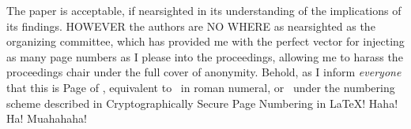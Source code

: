 \documentclass[12pt]{sigbovik-review}
\author{Anonymous}
\begin{document}
\maketitle

The paper is acceptable, if nearsighted in its understanding of the implications of its findings. HOWEVER the authors are NO WHERE as nearsighted as the organizing committee, which has provided me with the perfect vector for injecting as many page numbers as I please into the proceedings, allowing me to harass the proceedings chair under the full cover of anonymity. Behold, as I inform \emph{everyone} that this is Page \thepage \hspace{1pt} of \pageref{LastPage}, equivalent to \romannumeral \thepage\ in roman numeral, or \shalookup \thepage\ under the numbering scheme described in Cryptographically Secure Page Numbering in \LaTeX! Haha! Ha! Muahahaha! 
\end{document}
